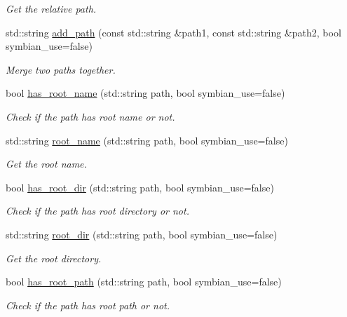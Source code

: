 \begin{DoxyCompactItemize}
\begin{DoxyCompactList}\small\item\em Get the relative path. \end{DoxyCompactList}\item 
std\+::string \mbox{\hyperlink{namespaceeka2l1_a447fec37657cd384bc6a7782b898731d}{add\+\_\+path}} (const std\+::string \&path1, const std\+::string \&path2, bool symbian\+\_\+use=false)
\begin{DoxyCompactList}\small\item\em Merge two paths together. \end{DoxyCompactList}\item 
bool \mbox{\hyperlink{namespaceeka2l1_a380aae3ddef8d345a83d266e4feb21ba}{has\+\_\+root\+\_\+name}} (std\+::string path, bool symbian\+\_\+use=false)
\begin{DoxyCompactList}\small\item\em Check if the path has root name or not. \end{DoxyCompactList}\item 
std\+::string \mbox{\hyperlink{namespaceeka2l1_aea213c386c9fc3a4922db87e29cf3183}{root\+\_\+name}} (std\+::string path, bool symbian\+\_\+use=false)
\begin{DoxyCompactList}\small\item\em Get the root name. \end{DoxyCompactList}\item 
bool \mbox{\hyperlink{namespaceeka2l1_a898023654cdb1beee83a05f139dc9b18}{has\+\_\+root\+\_\+dir}} (std\+::string path, bool symbian\+\_\+use=false)
\begin{DoxyCompactList}\small\item\em Check if the path has root directory or not. \end{DoxyCompactList}\item 
std\+::string \mbox{\hyperlink{namespaceeka2l1_a5ec05e7db5c7f34d77bd67bb6bbdec78}{root\+\_\+dir}} (std\+::string path, bool symbian\+\_\+use=false)
\begin{DoxyCompactList}\small\item\em Get the root directory. \end{DoxyCompactList}\item 
bool \mbox{\hyperlink{namespaceeka2l1_ac9756b37f4c2a3647cc168f5fe37c498}{has\+\_\+root\+\_\+path}} (std\+::string path, bool symbian\+\_\+use=false)
\begin{DoxyCompactList}\small\item\em Check if the path has root path or not. \end{DoxyCompactList}\item 

\end{DoxyCompactItemize}
